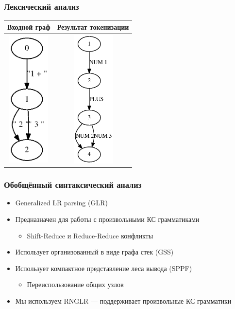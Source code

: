 \documentclass{beamer}
\begin{document}
\begin{frame}[fragile]
	\transwipe[direction=90]
	\frametitle{Лексический анализ}
	\begin{center}
	\begin{tabular}{c|c}
	  Входной граф
	  & Результат токенизации
	  \\
	  \hline
    \includegraphics[width=60pt]{picts/before_tokenization.eps}
    & \includegraphics[width=60pt]{picts/after_tokenization.eps}
  \end{tabular}
  \end{center}
\end{frame}

\begin{frame}[fragile]
	\transwipe[direction=90]
	\frametitle{Обобщённый синтаксический анализ}
    \begin{itemize}
    	\item Generalized LR parsing (GLR)
    	\item Предназначен для работы с произвольными КС грамматиками
	    \begin{itemize}
    	    \item Shift-Reduce и Reduce-Reduce конфликты
    	\end{itemize}
    	\item Использует организованный в виде графа стек (GSS)
	   	\item Использует компактное представление леса вывода (SPPF)
	        \begin{itemize}
	            \item Переиспользование общих узлов
	        \end{itemize}
      \item Мы используем RNGLR --- поддерживает произвольные КС грамматики
	\end{itemize}
\end{frame}
\end{document}
